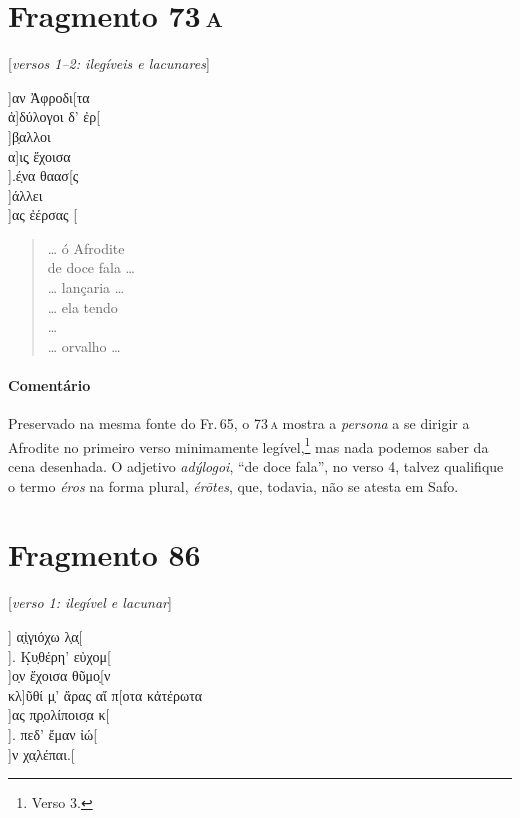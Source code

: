 \pagebreak

\section{Fragmento 73\,\textsc{a}} 

\begin{gkverse}
\textnormal{[\textit{versos 1--2: ilegíveis e lacunares}]}

]αν Ἀφροδι[τα\\
          ἀ]δύλογοι δ’ ἐρ[\\
        ]β̣αλλοι\\
      α]ις̣ ἔχοισα\\
     ].έ̣να θαασ[ς\\
     ]άλλει\\
     ]ας ἐέρσας [

\end{gkverse}

\begin{verse}
\ldots{} ó Afrodite\\
de doce fala \ldots{}\\
\ldots{} lançaria \ldots{}\\
\ldots{} ela tendo\\
\ldots{}\\
\ldots{} orvalho \ldots{}\\
\end{verse}

\medskip

{\paragraph{Comentário} Preservado na mesma fonte do Fr.\,65, o 73\,\textsc{a} mostra a \textit{persona} a se dirigir a Afrodite no primeiro verso minimamente legível,\footnote{Verso 3.} mas nada podemos saber da cena desenhada. O adjetivo \textit{adýlogoi}, ``de doce fala'', no verso 4, talvez qualifique o termo \textit{éros} na forma plural, \textit{érōtes}, que, todavia, não se atesta em Safo.}

\pagebreak

\section{Fragmento 86}

\begin{gkverse}
\textnormal{[\textit{verso 1: ilegível e lacunar}]}

] α̣ἰ̣γιόχω λ̣α̣[\\
]. Κ̣υ̣θέρη’ εὐχομ[\\
  ]ο̣ν ἔχοισα θῦμο̣[ν\\
κλ]ῦθί μ̣’ ἄρας αἴ π[οτα κἀτέρωτα\\
    ]ας π̣ρ̣ολίποισ̣α κ[\\
    ]. πεδ’ ἔμαν ἰώ[\\
        ]ν χα̣λέπαι.[

\end{gkverse}

